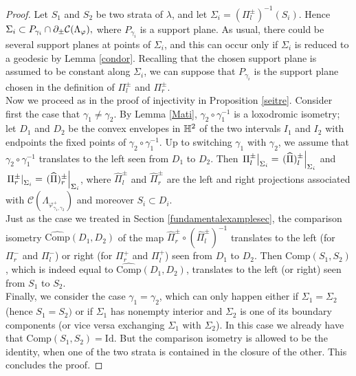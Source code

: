 \begin{proof}
    Let $S_1$ and $S_2$ be two strata of $\lambda$, and let $\Sigma_i=(\Pi_l^\pm)^{-1}(S_i).$ Hence $\Sigma_i\subset P_{\gamma_i}\cap\partial_\pm\mathcal{C}(\Lambda_\varphi),$ where $P_{\gamma_i}$ is a support plane. As usual, there could be several support planes at points of $\Sigma_i$, and this can occur only if $\Sigma_i$ is reduced to a geodesic by Lemma \ref{condor}. Recalling that the chosen support plane is assumed to be constant along $\Sigma_i$, we can suppose that $P_{\gamma_i}$ is the support plane chosen in the definition of $\Pi_l^\pm$ and $\Pi_r^\pm$.\\
    Now we proceed as in the proof of injectivity in Proposition \ref{seitre}. Consider first the case that $\gamma_1\neq\gamma_2$. By Lemma \ref{Mati}, $\gamma_2\circ\gamma_1^{-1}$ is a loxodromic isometry; let $D_1$ and $D_2$ be the convex envelopes in $\mathbb{H}^2$ of the two intervals $I_1$ and $I_2$ with endpoints the fixed points of $\gamma_2\circ\gamma_1^{-1}.$ Up to switching $\gamma_1$ with $\gamma_2$, we assume that $\gamma_2\circ\gamma_1^{-1}$ translates to the left seen from $D_1$ to $D_2$. Then $\left.\Pi_l^\pm\right|_{\Sigma_i}=\left.(\widehat{\Pi})_l^\pm\right|_{\Sigma_i}$ and $\left.\Pi_r^\pm\right|_{\Sigma_i}=\left.(\widehat{\Pi})_r^\pm\right|_{\Sigma_i}$, where $\widehat{\Pi}_l^\pm$ and $\widehat{\Pi}_r^\pm$ are the left and right projections associated with $\mathcal{C}(\Lambda_{\varphi_{\gamma_1,\gamma_2}^+})$ and moreover $S_i\subset D_i$.\\
    Just as the case we treated in Section \ref{fundamentalexamplesec}, the comparison isometry $\widehat{\text{Comp}}(D_1,D_2)$ of the map $\widehat{\Pi}_r^\pm\circ(\widehat{\Pi}_l^\pm)^{-1}$ translates to the left (for $\Pi_r^-$ and $\Pi_l^-$) or right (for $\Pi_r^+$ and $\Pi_l^+$) seen from $D_1$ to $D_2$. Then $\text{Comp}(S_1,S_2)$, which is indeed equal to $\widehat{\text{Comp}}(D_1,D_2)$, translates to the left (or right) seen from $S_1$ to $S_2.$\\
    Finally, we consider the case $\gamma_1=\gamma_2$, which can only happen either if $\Sigma_1=\Sigma_2$ (hence $S_1=S_2)$ or if $\Sigma_1$ has nonempty interior and $\Sigma_2$ is one of its boundary components (or vice versa exchanging $\Sigma_1$ with $\Sigma_2$). In this case we already have that $\text{Comp}(S_1,S_2)=\text{Id}$. But the comparison isometry is allowed to be the identity, when one of the two strata is contained in the closure of the other. This concludes the proof.

\end{proof}
